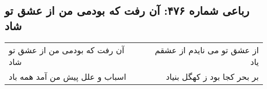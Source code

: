 \begin{center}
\section*{رباعی شماره ۴۷۶: آن رفت که بودمی من از عشق تو شاد}
\label{sec:0476}
\begin{longtable}{l p{0.5cm} r}
آن رفت که بودمی من از عشق تو شاد
&&
از عشق تو می نایدم از عشقم یاد
\\
اسباب و علل پیش من آمد همه باد
&&
بر بحر کجا بود ز کهگل بنیاد
\\
\end{longtable}
\end{center}
